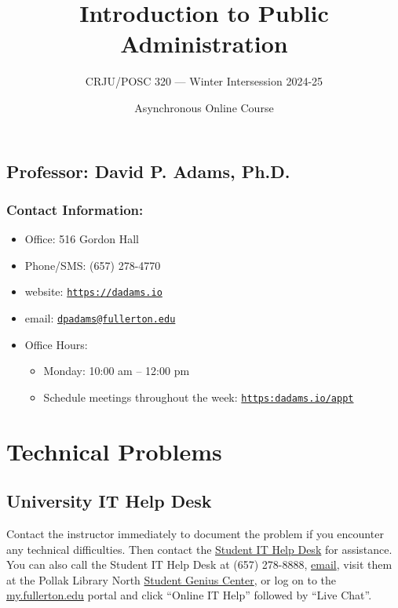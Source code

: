 \documentclass[11pt, letterpaper]{article}
\begin{document}
\title{Introduction to Public Administration}

\author{CRJU/POSC 320 — Winter Intersession 2024-25}
\date{Asynchronous Online Course}

    \maketitle


\subsection*{Professor: David P. Adams, Ph.D.}

\subsubsection*{Contact Information:}

\begin{itemize}
	\item Office: 516 Gordon Hall
	\item Phone/SMS: (657) 278-4770
	\item website: \href{https://dadams.io}{\texttt{https://dadams.io}}
	\item email: \href{dpadams@fullerton.edu}{\texttt{dpadams@fullerton.edu}}
	\item Office Hours:
        \begin{itemize}
            \item Monday: 10:00 am -- 12:00 pm
            \item Schedule meetings throughout the week: \href{https://dadams.io/appt}{\texttt{https:dadams.io/appt}}
        \end{itemize}
\end{itemize}


\section*{Technical Problems}

\subsection*{University IT Help Desk}

Contact the instructor immediately to document the problem if you encounter any technical difficulties. Then contact the \href{http://www.fullerton.edu/it/students/helpdesk/index.php}{Student IT Help Desk} for assistance. You can also call the Student IT Help Desk at (657) 278-8888, \href{mailto:StudentITHelpDesk@fullerton.edu}{email}, visit them at the Pollak Library North \href{http://www.fullerton.edu/it/students/sgc/index.php}{Student Genius Center}, or log on to the \href{http://my.fullerton.edu/}{my.fullerton.edu} portal and click ``Online IT Help'' followed by ``Live Chat''.
\end{document}
